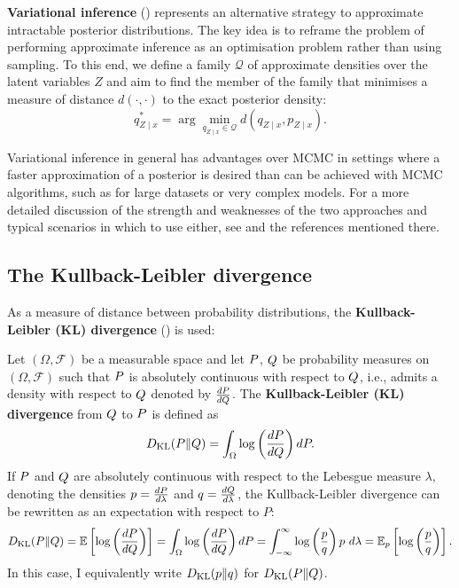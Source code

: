 \textbf{Variational inference} (\cite{Blei}) represents an alternative strategy to approximate intractable posterior distributions. The key idea is to reframe the problem of performing approximate inference as an optimisation problem rather than using sampling. To this end, we define a family $\mathcal{Q}$ of approximate densities over the latent variables $Z$ and aim to find the member of the family that minimises a measure of distance $d(\cdot,\cdot)$ to the exact posterior density:
\begin{equation}\label{var_inference_generaldistance}
	q^*_{Z\mid x} = \arg \min_{q_{Z\mid x}\in\mathcal{Q}} d(q_{Z\mid x},p_{Z\mid x}).
\end{equation}

Variational inference in general has advantages over MCMC in settings where a faster approximation of a posterior is desired than can be achieved with MCMC algorithms, such as for large datasets or very complex models. For a more detailed discussion of the strength and weaknesses of the two approaches and typical scenarios in which to use either, see \cite[p.~3]{Blei} and the references mentioned there.

\subsection{The Kullback-Leibler divergence}\label{sec:KL-div}

As a measure of distance between probability distributions, the \textbf{Kullback-Leibler (KL) divergence} (\cite[p.~72]{Goodfellow2016}) is used:
\begin{definition}
	Let $(\Omega,\mathcal{F})$ be a measurable space and let $\P$, $\Q$ be probability measures on $(\Omega, \mathcal{F})$ such that $\P$ is absolutely continuous with respect to $\Q$, i.e., admits a density with respect to $\Q$ denoted by $\frac{d\P}{d\Q}$. The \textbf{Kullback-Leibler (KL) divergence} from $\Q$ to $\P$ is defined as
	$$\dkl(\P\Vert \Q) = \int_{\Omega} \log\left(\frac{d\P}{d\Q}\right) d\P.
	$$   
	If $\P$ and $\Q$ are absolutely continuous with respect to the Lebesgue measure $\lambda$, denoting the densities $p=\frac{d\P}{d\lambda}$ and $q=\frac{d\Q}{d\lambda}$, the Kullback-Leibler divergence can be rewritten as an expectation with respect to $P$: 
	$$
	\dkl(\P\Vert \Q) = \E\left[\log\left(\frac{d\P}{d\Q}\right) \right] = \int_{\Omega} \log\left(\frac{d\P}{d\Q}\right) d\P = \int_{-\infty}^{\infty} \log\left(\frac{p}{q}\right) p~d\lambda = \E_{p}\left[\log\left(\frac{p}{q}\right)\right].
	$$
	In this case, I equivalently write $\dkl(p\Vert q)$ for $\dkl(\P\Vert \Q)$.
\end{definition}

